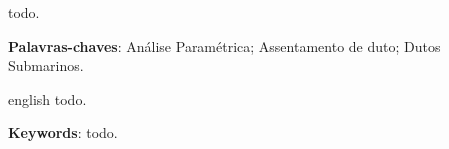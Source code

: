 
\setlength{\absparsep}{18pt} %
\begin{resumo}
todo.

 \textbf{Palavras-chaves}: Análise Paramétrica; Assentamento de duto; Dutos Submarinos.
\end{resumo}

\begin{resumo}[Abstract]
    \begin{otherlanguage*}{english}
    todo.

    \vspace{\onelineskip}

    \noindent 
    \textbf{Keywords}: todo.
    \end{otherlanguage*}
\end{resumo}